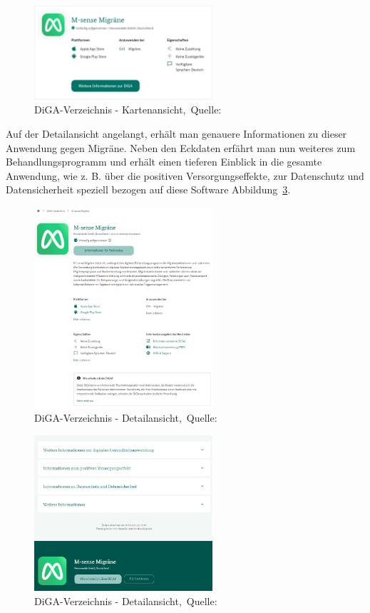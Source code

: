 \begin{figure}[H]
	\centering
	\includegraphics[width=250px, keepaspectratio]{assets/digaBSP1.png}
	\caption[DiGA-Verzeichnis - Kartenansicht]{DiGA-Verzeichnis - Kartenansicht,~Quelle:~\cite{digaverzeichnis}}
	\label{fig:mainTile}
\end{figure}
Auf der Detailansicht angelangt, erhält man genauere Informationen zu dieser Anwendung gegen Migräne. Neben den Eckdaten erfährt man nun weiteres zum Behandlungsprogramm und erhält einen tieferen Einblick in die gesamte Anwendung, wie z. B. über die positiven Versorgungseffekte, zur Datenschutz und Datensicherheit speziell bezogen auf diese Software Abbildung~\ref{fig:foot}.
\begin{figure}[H]
	\centering
	\includegraphics[width=250px]{assets/digaBSP2.png}
	\caption[DiGA-Verzeichnis - Detailansicht]{DiGA-Verzeichnis - Detailansicht,~Quelle:~\cite{digadetailansicht}}
	\label{fig:detailView}
\end{figure}

\begin{figure}[H]
	\centering
	\includegraphics[width=250px]{assets/digaBSP3.png}
	\caption[DiGA-Verzeichnis - Detailansicht]{DiGA-Verzeichnis - Detailansicht,~Quelle:~\cite{digadetailansicht}}
	\label{fig:foot}
\end{figure}

